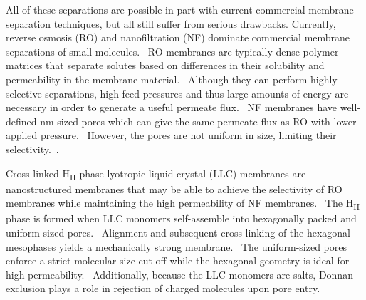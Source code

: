\documentclass[journal=jpcbfk,manuscript=article]{achemso}
\begin{document}
  All of these separations are possible in part with current commercial
  membrane separation techniques, but all still suffer from serious drawbacks.
  Currently, reverse osmosis (RO) and nanofiltration (NF) dominate commercial membrane
  separations of small molecules.~\cite{warsinger_review_2018} RO membranes are
  typically dense polymer matrices that separate solutes based on differences in
  their solubility and permeability in the membrane
  material.~\cite{fritzmann_state---art_2007} Although they can perform highly
  selective separations, high feed pressures and thus large amounts of energy
  are necessary in order to generate a useful permeate
  flux.~\cite{van_der_bruggen_review_2003} NF membranes have well-defined
  nm-sized pores which can give the same permeate flux as RO with lower applied
  pressure.~\cite{hilal_comprehensive_2004} However, the pores are not uniform in
  size, limiting their selectivity.~\cite{werber_materials_2016}.
  



  Cross-linked H\textsubscript{II} phase lyotropic liquid crystal (LLC) 
  membranes are nanostructured membranes that may be able to achieve the
  selectivity of RO membranes while maintaining the high permeability
  of NF membranes.~\cite{zhou_supported_2005} The H\textsubscript{II}
  phase is formed when LLC monomers self-assemble into hexagonally packed
  and uniform-sized pores.~\cite{smith_ordered_1997} Alignment and subsequent
  cross-linking of the hexagonal mesophases yields a mechanically strong
  membrane.~\cite{feng_scalable_2014,feng_thin_2016} The uniform-sized pores
  enforce a strict molecular-size cut-off while the hexagonal geometry is 
  ideal for high permeability.~\cite{zhou_supported_2005} Additionally, 
  because the LLC monomers are salts, Donnan exclusion plays a role in 
  rejection of charged molecules upon pore entry.~\cite{donnan_theory_1995}
\end{document}
